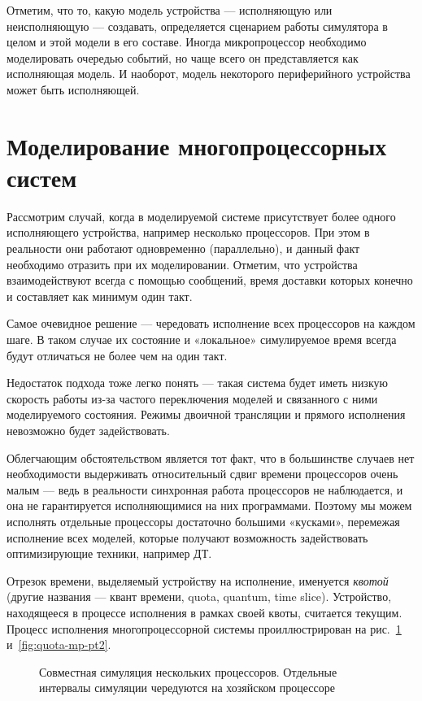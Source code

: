 Отметим, что то, какую модель устройства --- исполняющую или неисполняющую --- создавать, определяется сценарием работы симулятора в целом и этой модели в его составе. Иногда микропроцессор необходимо моделировать очередью событий, но чаще всего он представляется как исполняющая модель. И наоборот, модель некоторого периферийного устройства может быть исполняющей.

\section{Моделирование многопроцессорных систем}\label{sec:mp-simulation}

Рассмотрим случай, когда в моделируемой системе присутствует более одного исполняющего устройства, например несколько процессоров. При этом в реальности они работают одновременно (параллельно), и данный факт необходимо отразить при их моделировании. Отметим, что устройства взаимодействуют всегда с помощью сообщений, время доставки которых конечно и составляет как минимум один такт.

Самое очевидное решение --- чередовать исполнение всех процессоров на каждом  шаге. В таком случае их состояние и «локальное» симулируемое время всегда будут отличаться не более чем на один такт.

Недостаток подхода тоже легко понять --- такая система будет иметь низкую скорость работы из-за частого переключения моделей и связанного с ними моделируемого состояния. Режимы двоичной трансляции и прямого исполнения невозможно будет задействовать.

Облегчающим обстоятельством является тот факт, что в большинстве случаев нет необходимости выдерживать относительный сдвиг времени процессоров очень малым --- ведь в реальности синхронная работа процессоров не наблюдается, и она не гарантируется исполняющимися на них программами. Поэтому мы можем исполнять отдельные процессоры достаточно большими «кусками», перемежая исполнение всех моделей, которые получают возможность задействовать оптимизирующие техники, например ДТ. 

Отрезок времени, выделяемый устройству на исполнение, именуется \textit{квотой} (другие названия --- квант времени, quota, quantum, time slice). Устройство, находящееся в процессе исполнения в рамках своей квоты, считается текущим. Процесс исполнения многопроцессорной системы проиллюстрирован на рис.~\ref{fig:quota-mp-pt1} и~\ref{fig:quota-mp-pt2}.

\begin{figure}[htb]
    \centering
    \caption[Совместная симуляция нескольких процессоров, часть 1]{Совместная симуляция нескольких процессоров. Отдельные интервалы симуляции чередуются на хозяйском процессоре}
    \label{fig:quota-mp-pt1}
\end{figure}

